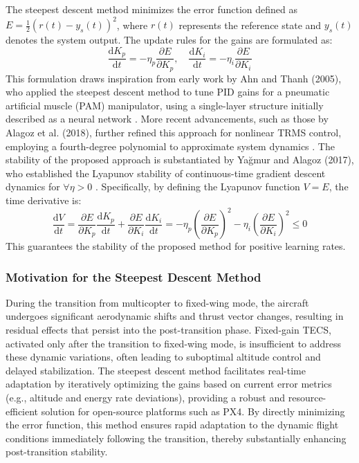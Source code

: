 \documentclass[journal,article,submit,pdftex,moreauthors]{Definitions/mdpi}
\begin{document}
The steepest descent method minimizes the error function defined as \(E = \frac{1}{2}(r(t) - y_s(t))^2\), where \(r(t)\) represents the reference state and \(y_s(t)\) denotes the system output. The update rules for the gains are formulated as:
\[
\frac{\mathrm{d} K_p}{\mathrm{d} t} = -\eta_p \frac{\partial E}{\partial K_p}, \quad \frac{\mathrm{d} K_i}{\mathrm{d} t} = -\eta_i \frac{\partial E}{\partial K_i}
\]
This formulation draws inspiration from early work by Ahn and Thanh (2005), who applied the steepest descent method to tune PID gains for a pneumatic artificial muscle (PAM) manipulator, using a single-layer structure initially described as a neural network \cite{Ahn2005}. More recent advancements, such as those by Alagoz et al. (2018), further refined this approach for nonlinear TRMS control, employing a fourth-degree polynomial to approximate system dynamics \cite{Alagoz2018}. The stability of the proposed approach is substantiated by Yağmur and Alagoz (2017), who established the Lyapunov stability of continuous-time gradient descent dynamics for \(\forall \eta > 0\) \cite{Yagmur2017}. Specifically, by defining the Lyapunov function \(V = E\), the time derivative is:
\[
\frac{\mathrm{d} V}{\mathrm{d} t} = \frac{\partial E}{\partial K_p} \frac{\mathrm{d} K_p}{\mathrm{d} t} + \frac{\partial E}{\partial K_i} \frac{\mathrm{d} K_i}{\mathrm{d} t} = -\eta_p \left( \frac{\partial E}{\partial K_p} \right)^2 - \eta_i \left( \frac{\partial E}{\partial K_i} \right)^2 \leq 0
\]
This guarantees the stability of the proposed method for positive learning rates.

\subsubsection{Motivation for the Steepest Descent Method}
During the transition from multicopter to fixed-wing mode, the aircraft undergoes significant aerodynamic shifts and thrust vector changes, resulting in residual effects that persist into the post-transition phase. Fixed-gain TECS, activated only after the transition to fixed-wing mode, is insufficient to address these dynamic variations, often leading to suboptimal altitude control and delayed stabilization. The steepest descent method facilitates real-time adaptation by iteratively optimizing the gains based on current error metrics (e.g., altitude and energy rate deviations), providing a robust and resource-efficient solution for open-source platforms such as PX4. By directly minimizing the error function, this method ensures rapid adaptation to the dynamic flight conditions immediately following the transition, thereby substantially enhancing post-transition stability.
\end{document}
